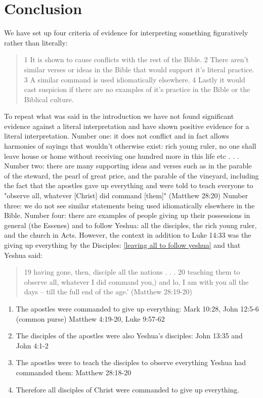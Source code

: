 \documentclass[11pt]{article}
\begin{document}
\section{Conclusion}
We have set up four criteria of evidence for interpreting something figuratively rather than literally:
\begin{quote}
1 It is shown to cause conflicts with the rest of the Bible. 2 There aren't similar verses or ideas in the Bible that would support it's literal practice. 3 A similar command is used idiomatically elsewhere. 4 Lastly it would cast suspicion if there are no examples of it's practice in the Bible or the Biblical culture.
\end{quote}
To repeat what was said in the introduction we have not found significant evidence against a literal interpretation and have shown positive evidence for a literal interpretation. Number one: it does not conflict and in fact allows harmonies of sayings that wouldn't otherwise exist: rich young ruler, no one shall leave house or home without receiving one hundred more in this life etc . . . Number two: there are many supporting ideas and verses such as in the parable of the steward, the pearl of great price, and the parable of the vineyard, including the fact that the apostles gave up everything and were told to teach everyone to "observe all, whatever [Christ] did command [them]" (Matthew 28:20) Number three: we do not see similar statements being used idiomatically elsewhere in the Bible. Number four: there are examples of people giving up their possessions in general (the Essenes) and to follow Yeshua: all the disciples, the rich young ruler, and the church in Acts. 
However, the context in addition to Luke 14:33 was the giving up everything by the Disciples: \ref{leaving all to follow yeshua} and that Yeshua said: 
\begin{quote}
19 having gone, then, disciple all the nations . . .
20 teaching them to observe all, whatever I did command you,) and lo, I am with you all the days -- till the full end of the age.' (Matthew 28:19-20)\end{quote}
\begin{enumerate}
\item The apostles were commanded to give up everything: Mark 10:28, John 12:5-6 (common purse) Matthew 4:19-20, Luke 9:57-62 
\item The disciples of the apostles were also Yeshua's disciples: John 13:35 and John 4:1-2 
\item The apostles were to teach the disciples to observe everything Yeshua had commanded them: Matthew 28:18-20
\item Therefore all disciples of Christ were commanded to give up everything.
\end{enumerate}
\end{document}
